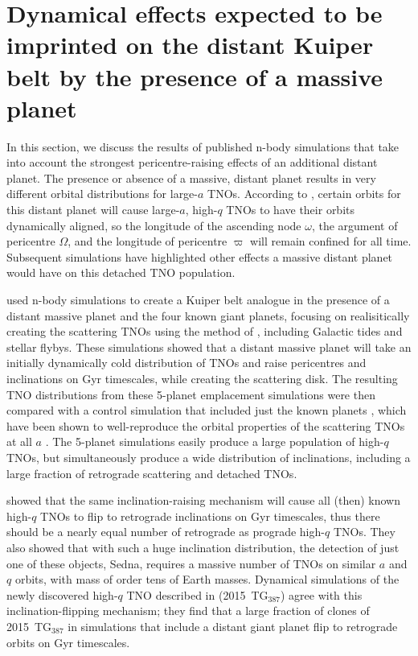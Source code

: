 \documentclass{aastex62}
\begin{document}
\section{Dynamical effects expected to be imprinted on the distant Kuiper belt by the presence of a massive planet}

In this section, we discuss the results of published n-body simulations that take into account the strongest pericentre-raising effects of an additional distant planet.
The presence or absence of a massive, distant planet results in very different orbital distributions for large-$a$ TNOs.  
According to \citet{batyginbrown16}, certain orbits for this distant planet will cause large-$a$, high-$q$ TNOs to have their orbits dynamically aligned, so the longitude of the ascending node $\omega$, the argument of pericentre $\Omega$, and the longitude of pericentre $\varpi$ will remain confined for all time.
Subsequent simulations have highlighted other effects a massive distant planet would have on this detached TNO population.

\citet{lawler2017} used n-body simulations to create a Kuiper belt analogue in the presence of a distant massive planet and the four known giant planets, focusing on realisitically creating the scattering TNOs using the method of \citet{kaib11b}, including Galactic tides and stellar flybys.  
These simulations showed that a distant massive planet will take an initially dynamically cold distribution of TNOs and raise pericentres and inclinations on Gyr timescales, while creating the scattering disk.
The resulting TNO distributions from these 5-planet emplacement simulations were then compared with a control simulation that included just the known planets \citep{kaib11b}, which have been shown to well-reproduce the orbital properties of the scattering TNOs at all $a$ \citep{shankman13,lawler2018scat}. 
The 5-planet simulations easily produce a large population of high-$q$ TNOs, but simultaneously produce a wide distribution of inclinations, including a large fraction of retrograde scattering and detached TNOs.

\citet{shankman17} showed that the same inclination-raising mechanism will cause all (then) known high-$q$ TNOs to flip to retrograde inclinations on Gyr timescales, thus there should be a nearly equal number of retrograde as prograde high-$q$ TNOs.
They also showed that with such a huge inclination distribution, the detection of just one of these objects, Sedna, requires a massive number of TNOs on similar $a$ and $q$ orbits, with mass of order tens of Earth masses.
Dynamical simulations of the newly discovered high-$q$ TNO described in \citet{sheppard18} (2015~TG$_{387}$) agree with this inclination-flipping mechanism; they find that a large fraction of clones of 2015~TG$_{387}$ in simulations that include a distant giant planet flip to retrograde orbits on Gyr timescales.
\end{document}
